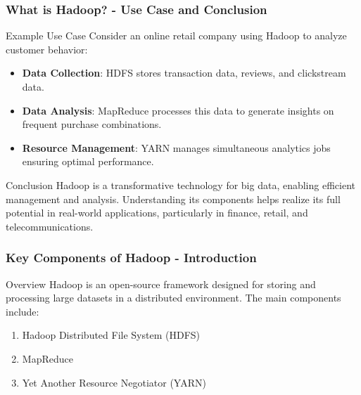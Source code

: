 \documentclass[aspectratio=169]{beamer}
\begin{document}
\begin{frame}[fragile]
    \frametitle{What is Hadoop? - Use Case and Conclusion}

    \begin{block}{Example Use Case}
        Consider an online retail company using Hadoop to analyze customer behavior:
        \begin{itemize}
            \item \textbf{Data Collection}: HDFS stores transaction data, reviews, and clickstream data.
            \item \textbf{Data Analysis}: MapReduce processes this data to generate insights on frequent purchase combinations.
            \item \textbf{Resource Management}: YARN manages simultaneous analytics jobs ensuring optimal performance.
        \end{itemize}
    \end{block}

    \begin{block}{Conclusion}
        Hadoop is a transformative technology for big data, enabling efficient management and analysis. Understanding its components helps realize its full potential in real-world applications, particularly in finance, retail, and telecommunications.
    \end{block}
\end{frame}

\begin{frame}[fragile]
    \frametitle{Key Components of Hadoop - Introduction}
    \begin{block}{Overview}
        Hadoop is an open-source framework designed for storing and processing large datasets in a distributed environment. The main components include:
    \end{block}
    \begin{enumerate}
        \item Hadoop Distributed File System (HDFS)
        \item MapReduce
        \item Yet Another Resource Negotiator (YARN)
    \end{enumerate}
\end{frame}
\end{document}
